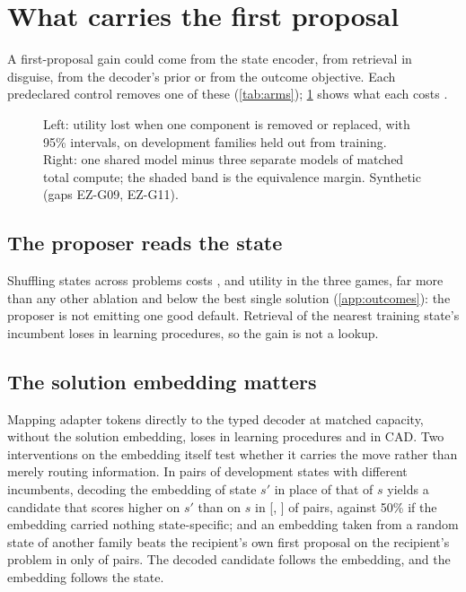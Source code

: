 \section{What carries the first proposal}
\label{sec:mechanisms}

A first-proposal gain could come from the state encoder, from retrieval in disguise, from the
decoder's prior or from the outcome objective. Each predeclared control removes one of these
(\cref{tab:arms}); \cref{fig:ablation} shows what each costs \synbadge.

\begin{figure}[t]
\centering

\caption{Left: utility lost when one component is removed or replaced, with 95\% intervals, on
development families held out from training. Right: one shared model minus three separate models of
matched total compute; the shaded band is the equivalence margin. Synthetic (gaps EZ-G09, EZ-G11).}
\label{fig:ablation}
\end{figure}

\subsection{The proposer reads the state}

Shuffling states across problems costs \syn[EZ-G09]{\EZshufA}, \syn[EZ-G09]{\EZshufB} and
\syn[EZ-G09]{\EZshufC} utility in the three games, far more than any other ablation and below the
best single solution (\cref{app:outcomes}): the proposer is not emitting one good default. Retrieval of the nearest training
state's incumbent loses \syn[EZ-G09]{\EZabRetA} in learning procedures, so the gain is not a lookup.

\subsection{The solution embedding matters}

Mapping adapter tokens directly to the typed decoder at matched capacity, without the solution
embedding, loses \syn[EZ-G09]{\EZabDirectA} in learning procedures and \syn[EZ-G09]{\EZabDirectC} in
CAD. Two interventions on the embedding itself test whether it carries the move rather than merely
routing information. In \syn[EZ-G09]{\EZswapPairs} pairs of development states with different
incumbents, decoding the embedding of state $s'$ in place of that of $s$ yields a candidate that
scores higher on $s'$ than on $s$ in \syn[EZ-G09]{\EZswapRate\%} [\syn[EZ-G09]{\EZswapRateLo},
\syn[EZ-G09]{\EZswapRateHi}] of pairs, against 50\% if the embedding carried nothing
state-specific; and an embedding taken from a random state of another family beats the recipient's own
first proposal on the recipient's problem in only \syn[EZ-G09]{\EZswapShuffled\%} of pairs. The
decoded candidate follows the embedding, and the embedding follows the state.

